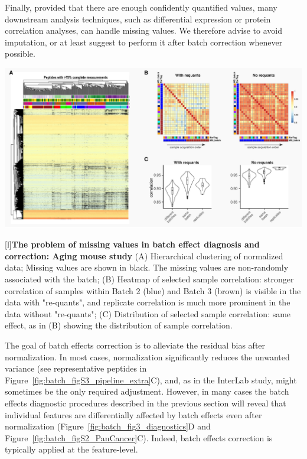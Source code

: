 \documentclass[num-refs]{wiley-article}
\begin{document}
{\begin{tcolorbox}
		Finally, provided that there are enough confidently quantified values, many downstream analysis techniques, such as differential expression or protein correlation analyses, can handle missing values. We therefore advise to avoid imputation, or at least suggest to perform it after batch correction whenever possible. 

		
		\begin{minipage}[h]{\linewidth}
			\includegraphics[width=.99\textwidth]{figures/Fig4_missing_values2.pdf}
		
	\vspace{-0.5cm}	{\textbf{The problem of missing values in batch effect diagnosis and correction: Aging mouse study} }
			\label{fig:batch_fig4_missing_values}
			{\footnotesize  (A) Hierarchical clustering of normalized data; Missing values are shown in black. The missing values are non-randomly associated with the batch; (B) Heatmap of selected sample correlation: stronger correlation of samples within Batch 2 (blue) and Batch 3 (brown) is visible in the data with "re-quants", and replicate correlation is much more prominent in the data without "re-quants";	(C) Distribution of selected sample correlation: same effect, as in (B) showing the distribution of sample correlation.}
		\end{minipage}
	\end{tcolorbox}
	\clearpage
}

The goal of batch effects correction is to alleviate the residual bias after normalization. In most cases, normalization significantly reduces the unwanted variance (see representative peptides in Figure~\ref{fig:batch_figS3_pipeline_extra}C), and, as in the InterLab study, might sometimes be the only required adjustment. However, in many cases the batch effects diagnostic procedures described in the previous section will reveal that individual features are differentially affected by batch effects even after normalization (Figure~\ref{fig:batch_fig3_diagnostics}D and Figure~\ref{fig:batch_figS2_PanCancer}C). Indeed, batch effects correction is typically applied at the feature-level.
\end{document}

